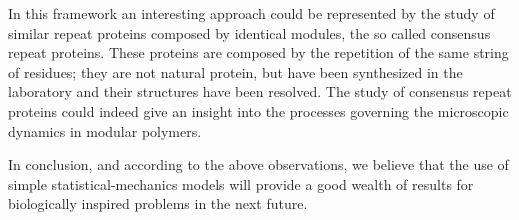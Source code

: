 In this framework an interesting approach could be represented by the study of
similar repeat proteins composed by identical modules, the so called consensus repeat
proteins.
These proteins are composed by the repetition of the same string of residues; they are not natural protein, but have been  synthesized in the 
laboratory and their structures have been resolved.
The study of consensus repeat proteins could indeed give an insight into the
processes governing the microscopic dynamics in modular polymers.

In conclusion, and according to the above observations, we believe that the use of simple statistical-mechanics models will provide a good wealth of results for biologically inspired problems in the next future.

